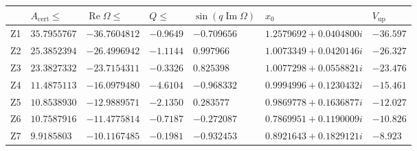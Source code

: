 \documentclass[11pt]{amsart}
\theoremstyle{definition}
\theoremstyle{remark}
\numberwithin{equation}{section}
\newcommand{\Acert}{A_{\mathrm{cert}}}
\renewcommand{\Re}{\operatorname{Re}}
\renewcommand{\Im}{\operatorname{Im}}
\begin{document}
\begin{table}[ht]
\centering\footnotesize\setlength{\tabcolsep}{2pt}
\begin{tabular}{@{}lllllll@{}}
\toprule
 & $\Acert\le$ & $\Re\Omega\le$ & $Q\le$ & $\sin(q\Im\Omega)$ & $x_0$ & $V_{\mathrm{up}}$\\
\midrule
Z1 & $35.7955767$ & $-36.7604812$ & $-0.9649$ & $-0.709656$ & $1.2579692+0.0404800i$ & $-36.597$\\
Z2 & $25.3852394$ & $-26.4996942$ & $-1.1144$ & $0.997966$ & $1.0073349+0.0420146i$ & $-26.327$\\
Z3 & $23.3827332$ & $-23.7154311$ & $-0.3326$ & $0.825398$ & $1.0077298+0.0558821i$ & $-23.476$\\
Z4 & $11.4875113$ & $-16.0979480$ & $-4.6104$ & $-0.968332$ & $0.9994996+0.1230432i$ & $-15.461$\\
Z5 & $10.8538930$ & $-12.9889571$ & $-2.1350$ & $0.283577$ & $0.9869778+0.1636877i$ & $-12.027$\\
Z6 & $10.7587916$ & $-11.4775814$ & $-0.7187$ & $-0.272087$ & $0.7869951+0.1190009i$ & $-10.826$\\
Z7 & $9.9185803$ & $-10.1167485$ & $-0.1981$ & $-0.932453$ & $0.8921643+0.1829121i$ & $-8.923$\\
\bottomrule
\end{tabular}


\end{table}
\end{document}
